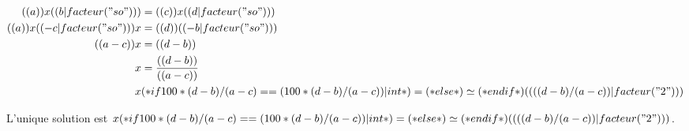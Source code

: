 \exercice*

\begin{align*}
  (( a )) x (( b|facteur("so") )) &= (( c )) x (( d|facteur("so") )) \\
  (( a )) x (( -c|facteur("so") ))x &= (( d )) (( -b|facteur("so") )) \\
  (( a - c )) x &= (( d - b )) \\
  x &= \frac{(( d - b ))}{(( a - c ))} \\
  x &
        (* if 100*(d-b)/(a-c) == (100*(d-b)/(a-c))|int *)
            =
        (* else *)
            \simeq
        (* endif *)
        (( ((d-b)/(a-c)) | facteur("2") ))
\end{align*}

L'unique solution est
$x
(* if 100*(d-b)/(a-c) == (100*(d-b)/(a-c))|int *)
    =
(* else *)
    \simeq
(* endif *)
(( ((d-b)/(a-c)) | facteur("2") ))$.
